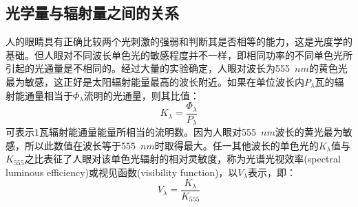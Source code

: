 \subsection{光学量与辐射量之间的关系}
人的眼睛具有正确比较两个光刺激的强弱和判断其是否相等的能力，这是光度学的基础。但人眼对不同波长单色光的敏感程度并不一样，即相同功率的不同单色光所引起的光通量是不相同的。经过大量的实验确定，人眼对波长为555~$nm$的黄色光最为敏感，这正好是太阳辐射能量最高的波长附近。如果在单位波长内$P_{\lambda}$瓦的辐射能通量相当于$\Phi_{\lambda}$流明的光通量，则其比值：
\begin{equation}
\label{luminance_per_watt}
K_{\lambda} = \dfrac{\Phi_{\lambda}}{P_{\lambda}}
\end{equation}
可表示1瓦辐射能通量能量所相当的流明数。因为人眼对555~$nm$波长的黄光最为敏感，所以此数值在波长等于555~$nm$时取得最大。任一其他波长的单色光的$K_{\lambda}$值与$K_{555}$之比表征了人眼对该单色光辐射的相对灵敏度，称为光谱光视效率(spectral luminous efficiency)或视见函数(visibility function)，以$V_{\lambda}$表示，即：
\begin{equation}
\label{visibility_function}
V_{\lambda} = \dfrac{K_{\lambda}}{K_{555}}
\end{equation}

